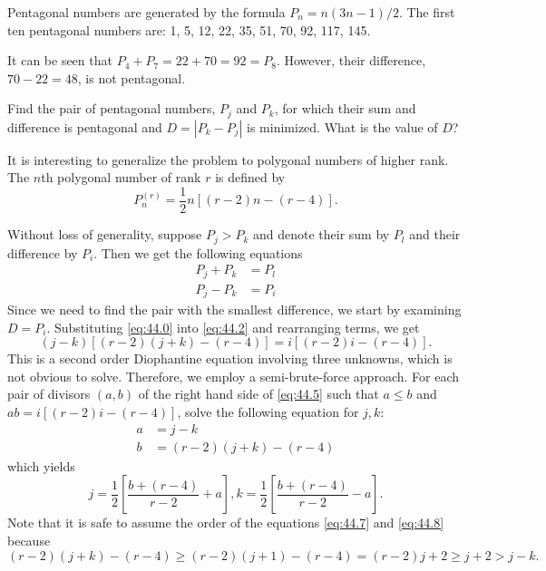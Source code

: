 




Pentagonal numbers are generated by the formula $P_n=n(3n-1)/2$. The first ten pentagonal numbers are: 
1, 5, 12, 22, 35, 51, 70, 92, 117, 145.
 
It can be seen that $P_4 + P_7 = 22 + 70 = 92 = P_8$. However, their difference, $70 - 22 = 48$, is not pentagonal.
 
Find the pair of pentagonal numbers, $P_j$ and $P_k$, for which their sum and difference is pentagonal and $D = |P_k - P_j|$ is minimized. What is the value of $D$?

\solution

It is interesting to generalize the problem to polygonal numbers of higher rank. The $n$th polygonal number of rank $r$ is defined by
\begin{equation}
P_n^{(r)} = \frac12 n[(r-2)n - (r-4)] . \label{eq:44.0}
\end{equation}

Without loss of generality, suppose $P_j > P_k$ and denote their sum by $P_l$ and their difference by $P_i$. Then we get the following equations
\begin{align}
P_j + P_k &= P_l \label{eq:44.1}  \\
P_j - P_k &= P_i \label{eq:44.2}  
\end{align}
Since we need to find the pair with the smallest difference, we start by examining $D = P_i$. Substituting \eqref{eq:44.0} into \eqref{eq:44.2} and rearranging terms, we get
\begin{equation}
(j-k)[(r-2)(j+k)-(r-4)] = i[(r-2)i-(r-4)] . \label{eq:44.5}
\end{equation}
This is a second order Diophantine equation involving three unknowns, which is not obvious to solve. Therefore, we employ a semi-brute-force approach. For each pair of divisors $(a, b)$ of the right hand side of \eqref{eq:44.5} such that $a \le b$ and $ab =  i[(r-2)i-(r-4)]$, solve the following equation for $j, k$:
\begin{align}
a &= j-k \label{eq:44.7} \\
b &= (r-2)(j+k)-(r-4) \label{eq:44.8} 
\end{align}
which yields
\begin{equation}
j = \frac12 \left[\frac{b+(r-4)}{r-2}+a\right],  
k = \frac12 \left[\frac{b+(r-4)}{r-2}-a\right] . \label{eq:44.9}
\end{equation}
Note that it is safe to assume the order of the equations \eqref{eq:44.7} and \eqref{eq:44.8} because
\[
(r-2)(j+k)-(r-4) \ge (r-2)(j+1)-(r-4) = (r-2)j+2 \ge j+2 > j-k .
\]

